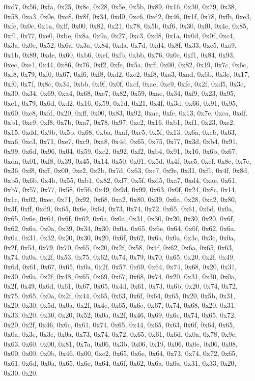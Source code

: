 \documentclass[
]{book}
\begin{document}
0xd7, 0x56, 0xfa, 0x25, 0x8c, 0x28, 0x5e, 0x5b, 0x89, 0x16, 0x30, 0x79, 0x38, 0x58, 0xa3, 0x0e, 0xc8, 0x8f, 0x34, 0xd0, 0xc6, 0xd2, 0x46, 0x1f, 0x78, 0xfb, 0xe3, 0xfe, 0x0e, 0x1a, 0xff, 0x00, 0x82, 0x21, 0x78, 0x5b, 0xf6, 0x30, 0xf0, 0x4e, 0x85, 0xf1, 0x77, 0xe0, 0xbe, 0x8a, 0x9a, 0x27, 0xc3, 0xd8, 0x1a, 0x0d, 0x0f, 0xc4, 0x3a, 0x0c, 0x52, 0x6a, 0x3a, 0x84, 0xda, 0x7d, 0xd4, 0x8f, 0x33, 0xc5, 0xa9, 0x1b, 0x89, 0xde, 0x60, 0xb6, 0xef, 0xfb, 0xbb, 0x76, 0x0e, 0xf1, 0x84, 0x93, 0xec, 0xe1, 0x44, 0x86,
0x76, 0xf2, 0xfe, 0x5a, 0xff, 0x00, 0x82, 0x19, 0x7c, 0x6c, 0xf8, 0x79, 0xf0, 0x67, 0xf6, 0xf8, 0xd2, 0xe2, 0xf8, 0xa3, 0xad, 0x6b, 0x3e, 0x17, 0xf0, 0x7f, 0x8c, 0x34, 0xbb, 0x9f, 0x0f, 0xcf, 0xae, 0xe9, 0xfe, 0x2f, 0xd5, 0x3c, 0x30, 0x34, 0x69, 0xa4, 0x68, 0xe7, 0x82, 0x59, 0xae, 0x34, 0xf9, 0x23, 0x95, 0xe1, 0x79, 0x6d, 0xd2, 0x16, 0x59, 0x1d, 0x21, 0x4f, 0x3d, 0x66, 0x91, 0x95, 0x60, 0xc8, 0xfd, 0x20, 0xff, 0x00, 0x83, 0x92, 0xae, 0xfe, 0x13, 0x7e, 0xca, 0xdf, 0xb1, 0xe9, 0xf8, 0x7b, 0xa7, 0x78,
0x97, 0xe2, 0x16, 0xb1, 0xf1, 0x23, 0xe2, 0x15, 0xdd, 0x9b, 0x5b, 0x68, 0xba, 0xaf, 0xc5, 0x5f, 0x13, 0x6a, 0xeb, 0x63, 0xa6, 0xc3, 0x71, 0xe7, 0xc9, 0xa8, 0x4d, 0x65, 0x75, 0x77, 0x3d, 0xb4, 0x91, 0x99, 0x6d, 0x96, 0x04, 0x59, 0xc2, 0x92, 0xf2, 0xb4, 0x91, 0x16, 0x6b, 0x67, 0xda, 0x01, 0xf8, 0x39, 0x45, 0x14, 0x50, 0x01, 0x5d, 0x4f, 0xc5, 0xcf, 0x8e, 0x7e, 0x36, 0xf8, 0xff, 0x00, 0xe2, 0x2b, 0x7d, 0x63, 0xc7, 0x9e, 0x31, 0xf1, 0x4f, 0x8d, 0xb5, 0x6b, 0x4b, 0x55, 0xb1, 0x82, 0xf7, 0x5f, 0xd5, 0xa7,
0xd4, 0xae, 0x61, 0xb7, 0x57, 0x77, 0x58, 0x56, 0x49, 0x9d, 0x99, 0x63, 0x0f, 0x24, 0x8c, 0x14, 0x1c, 0x02, 0xec, 0x71, 0x92, 0x68, 0xa2, 0x80, 0x39, 0x6a, 0x28, 0xa2, 0x80, 0x3f, 0xff, 0xd9, 0x65, 0x6e, 0x64, 0x73, 0x74, 0x72, 0x65, 0x61, 0x6d, 0x0a, 0x65, 0x6e, 0x64, 0x6f, 0x62, 0x6a, 0x0a, 0x31, 0x30, 0x20, 0x30, 0x20, 0x6f, 0x62, 0x6a, 0x0a, 0x39, 0x34, 0x30, 0x0a, 0x65, 0x6e, 0x64, 0x6f, 0x62, 0x6a, 0x0a, 0x31, 0x32, 0x20, 0x30, 0x20, 0x6f, 0x62, 0x6a, 0x0a, 0x3c, 0x3c, 0x0a, 0x2f, 0x54, 0x79,
0x70, 0x65, 0x20, 0x2f, 0x58, 0x4f, 0x62, 0x6a, 0x65, 0x63, 0x74, 0x0a, 0x2f, 0x53, 0x75, 0x62, 0x74, 0x79, 0x70, 0x65, 0x20, 0x2f, 0x49, 0x6d, 0x61, 0x67, 0x65, 0x0a, 0x2f, 0x57, 0x69, 0x64, 0x74, 0x68, 0x20, 0x31, 0x30, 0x0a, 0x2f, 0x48, 0x65, 0x69, 0x67, 0x68, 0x74, 0x20, 0x31, 0x30, 0x0a, 0x2f, 0x49, 0x6d, 0x61, 0x67, 0x65, 0x4d, 0x61, 0x73, 0x6b, 0x20, 0x74, 0x72, 0x75, 0x65, 0x0a, 0x2f, 0x44, 0x65, 0x63, 0x6f, 0x64, 0x65, 0x20, 0x5b, 0x31, 0x20, 0x30, 0x5d, 0x0a, 0x2f, 0x4c, 0x65, 0x6e, 0x67,
0x74, 0x68, 0x20, 0x31, 0x33, 0x20, 0x30, 0x20, 0x52, 0x0a, 0x2f, 0x46, 0x69, 0x6c, 0x74, 0x65, 0x72, 0x20, 0x2f, 0x46, 0x6c, 0x61, 0x74, 0x65, 0x44, 0x65, 0x63, 0x6f, 0x64, 0x65, 0x0a, 0x3e, 0x3e, 0x0a, 0x73, 0x74, 0x72, 0x65, 0x61, 0x6d, 0x0a, 0x78, 0x9c, 0x63, 0x60, 0x00, 0x81, 0x7a, 0x06, 0x3b, 0x06, 0x19, 0x06, 0x0e, 0x06, 0x08, 0x00, 0x00, 0x0b, 0x46, 0x00, 0xe2, 0x65, 0x6e, 0x64, 0x73, 0x74, 0x72, 0x65, 0x61, 0x6d, 0x0a, 0x65, 0x6e, 0x64, 0x6f, 0x62, 0x6a, 0x0a, 0x31, 0x33, 0x20, 0x30, 0x20,
\end{document}
